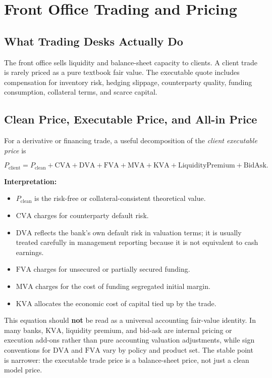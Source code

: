 \documentclass{apex_mdd}
\begin{document}
\section{Front Office Trading and Pricing}

\subsection{What Trading Desks Actually Do}

The front office sells liquidity and balance-sheet capacity to clients. A client trade is rarely priced as a pure textbook fair value. The executable quote includes compensation for inventory risk, hedging slippage, counterparty quality, funding consumption, collateral terms, and scarce capital.

\subsection{Clean Price, Executable Price, and All-in Price}

For a derivative or financing trade, a useful decomposition of the \emph{client executable price} is
\begin{formulabox}
\[
  P_{\mathrm{client}}
  =
  P_{\mathrm{clean}}
  + \mathrm{CVA}
  + \mathrm{DVA}
  + \mathrm{FVA}
  + \mathrm{MVA}
  + \mathrm{KVA}
  + \mathrm{LiquidityPremium}
  + \mathrm{BidAsk}.
\]
\end{formulabox}

\textbf{Interpretation:}
\begin{itemize}
  \item $P_{\mathrm{clean}}$ is the risk-free or collateral-consistent theoretical value.
  \item $\mathrm{CVA}$ charges for counterparty default risk.
  \item $\mathrm{DVA}$ reflects the bank's own default risk in valuation terms; it is usually treated carefully in management reporting because it is not equivalent to cash earnings.
  \item $\mathrm{FVA}$ charges for unsecured or partially secured funding.
  \item $\mathrm{MVA}$ charges for the cost of funding segregated initial margin.
  \item $\mathrm{KVA}$ allocates the economic cost of capital tied up by the trade.
\end{itemize}

This equation should \textbf{not} be read as a universal accounting fair-value identity. In many banks, $\mathrm{KVA}$, liquidity premium, and bid-ask are internal pricing or execution add-ons rather than pure accounting valuation adjustments, while sign conventions for $\mathrm{DVA}$ and $\mathrm{FVA}$ vary by policy and product set. The stable point is narrower: the executable trade price is a balance-sheet price, not just a clean model price.
\end{document}
